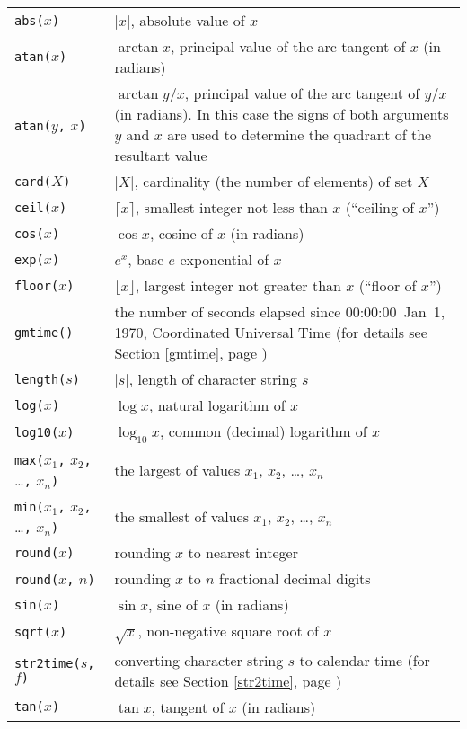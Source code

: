 \documentclass[11pt]{report}
\begin{document}
\begin{tabular}{@{}p{112pt}p{328pt}@{}}
{\tt abs(}$x${\tt)}&$|x|$, absolute value of $x$\\
{\tt atan(}$x${\tt)}&$\arctan x$, principal value of the arc tangent of
$x$ (in radians)\\
{\tt atan(}$y${\tt,} $x${\tt)}&$\arctan y/x$, principal value of the
arc tangent of $y/x$ (in radians). In this case the signs of both
arguments $y$ and $x$ are used to determine the quadrant of the
resultant value\\
{\tt card(}$X${\tt)}&$|X|$, cardinality (the number of elements) of
set $X$\\
{\tt ceil(}$x${\tt)}&$\lceil x\rceil$, smallest integer not less than
$x$ (``ceiling of $x$'')\\
{\tt cos(}$x${\tt)}&$\cos x$, cosine of $x$ (in radians)\\
{\tt exp(}$x${\tt)}&$e^x$, base-$e$ exponential of $x$\\
{\tt floor(}$x${\tt)}&$\lfloor x\rfloor$, largest integer not greater
than $x$ (``floor of $x$'')\\
{\tt gmtime()}&the number of seconds elapsed since 00:00:00~Jan~1, 1970,
Coordinated Universal Time (for details see Section \ref{gmtime},
page \pageref{gmtime})\\
{\tt length(}$s${\tt)}&$|s|$, length of character string $s$\\
{\tt log(}$x${\tt)}&$\log x$, natural logarithm of $x$\\
{\tt log10(}$x${\tt)}&$\log_{10}x$, common (decimal) logarithm of $x$\\
{\tt max(}$x_1${\tt,} $x_2${\tt,} \dots{\tt,} $x_n${\tt)}&the largest
of values $x_1$, $x_2$, \dots, $x_n$\\
{\tt min(}$x_1${\tt,} $x_2${\tt,} \dots{\tt,} $x_n${\tt)}&the smallest
of values $x_1$, $x_2$, \dots, $x_n$\\
{\tt round(}$x${\tt)}&rounding $x$ to nearest integer\\
{\tt round(}$x${\tt,} $n${\tt)}&rounding $x$ to $n$ fractional decimal
digits\\
{\tt sin(}$x${\tt)}&$\sin x$, sine of $x$ (in radians)\\
{\tt sqrt(}$x${\tt)}&$\sqrt{x}$, non-negative square root of $x$\\
{\tt str2time(}$s${\tt,} $f${\tt)}&converting character string $s$ to
calendar time (for details see Section \ref{str2time}, page
\pageref{str2time})\\
{\tt tan(}$x${\tt)}&$\tan x$, tangent of $x$ (in radians)\\

\end{tabular}
\end{document}
